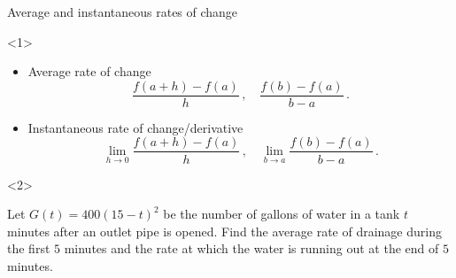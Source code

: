 \begin{frame}{Average and instantaneous rates of change}

\begin{onlyenv}<1>

\begin{itemize}
\item Average rate of change
\[
\frac{f\left(a+h\right)-f\left(a\right)}{h}\,,\quad\frac{f\left(b\right)-f\left(a\right)}{b-a}\,.
\]

\item Instantaneous rate of change/derivative
\[
\lim_{h\to0}\frac{f\left(a+h\right)-f\left(a\right)}{h}\,,\quad\lim_{b\to a}\frac{f\left(b\right)-f\left(a\right)}{b-a}\,.
\]

\end{itemize}
\end{onlyenv}



\begin{onlyenv}<2>

\begin{example}
Let $G\left(t\right)=400\left(15-t\right)^{2}$ be the number of gallons
of water in a tank $t$ minutes after an outlet pipe is opened. Find
the average rate of drainage during the first $5$ minutes and the
rate at which the water is running out at the end of $5$ minutes.
\end{example}

\end{onlyenv}

\end{frame}

